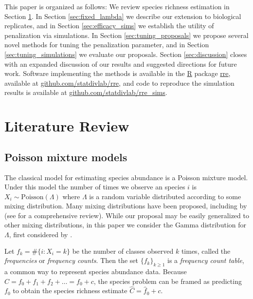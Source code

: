 \documentclass[oupdraft]{bio}
\begin{document}
This paper is organized as follows: We review species richness estimation in Section \ref{sec:literature_review}.  In Section \ref{sec:fixed_lambda} we describe our extension to biological replicates, and in Section \ref{sec:efficacy_sims} we establish the utility of penalization via simulations. In Section \ref{sec:tuning_proposals} we propose several novel methods for tuning the penalization parameter, and in Section \ref{sec:tuning_simulations}
we evaluate our proposals.  Section \ref{sec:discussion} closes with an expanded discussion of our results and suggested directions for future work. Software implementing the methods is available in the \url{R} package \url{rre}, available at \url{github.com/statdivlab/rre}, and code to reproduce the simulation results is available at \url{github.com/statdivlab/rre_sims}.


\section{Literature Review}

\label{sec:literature_review}

\subsection{Poisson mixture models}

The classical model for estimating species abundance is a Poisson mixture model.  Under this model the number of times we observe an species $i$ is $X_i \sim \text{Poisson}(\Lambda)$ where $\Lambda$ is a random variable distributed according to some mixing distribution.
Many mixing distributions have been proposed, including by  \cite{bulmer_1974,ord_1986,norris_1998} (see \cite{bunge_1993} for a comprehensive review). While our proposal may be easily generalized to other mixing distributions, in this paper we consider the Gamma  distribution for $\Lambda$, first considered by \citet{fisher_1943}.


Let $f_k = \#\{i: X_i = k\}$ be the number of classes observed $k$ times, called the \textit{frequencies} or \textit{frequency counts}.  Then the set $\{f_k\}_{k \geq 1}$ is a \textit{frequency count table}, a common way to represent species abundance data. Because $C = f_0 + f_1 + f_2 + \dots = f_0 + c$, the species problem can be framed as predicting $f_0$ to obtain the species richness estimate $\hat{C} = \hat{f}_0 + c$.
\end{document}
